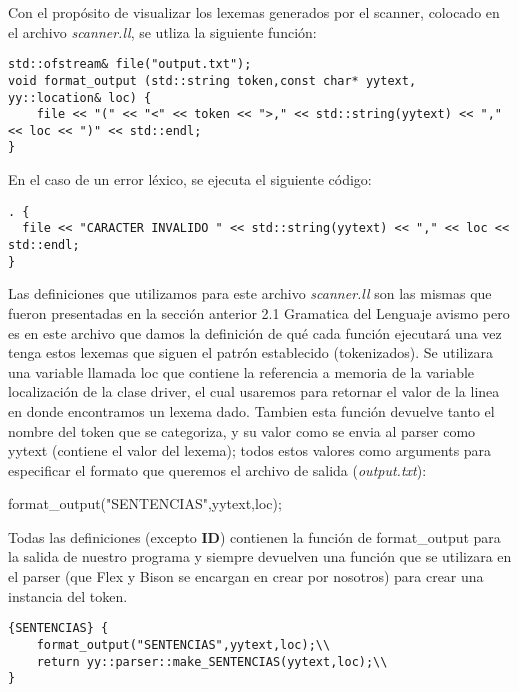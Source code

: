 Con el propósito de visualizar los lexemas generados por el scanner, colocado en el archivo \textit{scanner.ll}, se utliza la siguiente función:
\begin{lstlisting}
std::ofstream& file("output.txt");
void format_output (std::string token,const char* yytext, yy::location& loc) {
    file << "(" << "<" << token << ">," << std::string(yytext) << "," << loc << ")" << std::endl;
}
\end{lstlisting}
En el caso de un error léxico, se ejecuta el siguiente código:
\begin{lstlisting}
. {
  file << "CARACTER INVALIDO " << std::string(yytext) << "," << loc << std::endl;
}
\end{lstlisting}
Las definiciones que utilizamos para este archivo \textit{scanner.ll} son las mismas que fueron presentadas en la sección anterior 2.1 Gramatica del Lenguaje avismo
pero es en este archivo que damos la definición de qué cada función ejecutará una vez tenga estos lexemas que siguen el patrón establecido (tokenizados). Se utilizara
una variable llamada loc que contiene la referencia a memoria de la variable localización de la clase driver, el cual usaremos para retornar el valor de la linea en
donde encontramos un lexema dado. Tambien esta función devuelve tanto el nombre del token que se categoriza, y su valor como se envia al parser como yytext (contiene el valor del lexema);
todos estos valores como arguments para especificar el formato que queremos el archivo de salida (\textit{output.txt}):


format\_output("SENTENCIAS",yytext,loc);


Todas las definiciones (excepto \textbf{ID}) contienen la función de format\_output para la salida de nuestro programa y siempre devuelven una función que se
utilizara en el parser (que Flex y Bison se encargan en crear por nosotros) para crear una instancia del token.

\begin{lstlisting}
{SENTENCIAS} {
    format_output("SENTENCIAS",yytext,loc);\\
    return yy::parser::make_SENTENCIAS(yytext,loc);\\
}
\end{lstlisting}

